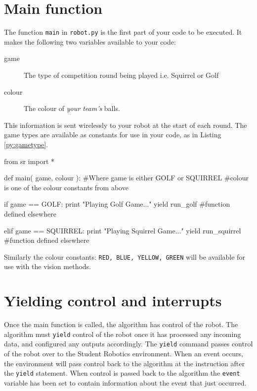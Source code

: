 \documentclass[a4paper, 12pt]{article}
\begin{document}
\section{Main function}
The function \texttt{main} in \texttt{robot.py} is the first part of your code to be executed. It makes the following two variables available to your code:
\begin{description}
\item[game] The type of competition round being played i.e. Squirrel or Golf
\item[colour]The colour of \textit{your team's} balls.
\end{description}

This information is sent wirelessly to your robot at the start of each round. The game types are available as constants for use in your code, as in Listing \ref{py:gametype}.
\begin{python}
\begin{verbatimtab}
from sr import * 

def main( game, colour ):
    #Where game is either GOLF or SQUIRREL
    #colour is one of the colour constants from above

    if game == GOLF:
        print "Playing Golf Game..."
        yield run_golf	#function defined elsewhere

    elif game == SQUIRREL:
        print "Playing Squirrel Game..."
        yield run_squirrel  #function defined elsewhere
\end{verbatimtab}
  \caption{\label{py:gametype}} 
\end{python}

Similarly the colour constants: \texttt{RED, BLUE, YELLOW, GREEN} will be available for use with the vision methods.


\section{Yielding control and interrupts}
Once the main function is called, the algorithm has control of the robot.  The
algorithm must \texttt{yield} control of the robot once it has
processed any incoming data, and configured any outputs accordingly.
The \texttt{yield} command passes control of the robot over to the
Student Robotics environment. When an event occurs, the environment will pass
control back to the algorithm at the instruction after the \texttt{yield}
statement.  When control is passed back to the
algorithm the \texttt{event} variable has been set to contain information
about the event that just occurred.
\end{document}

